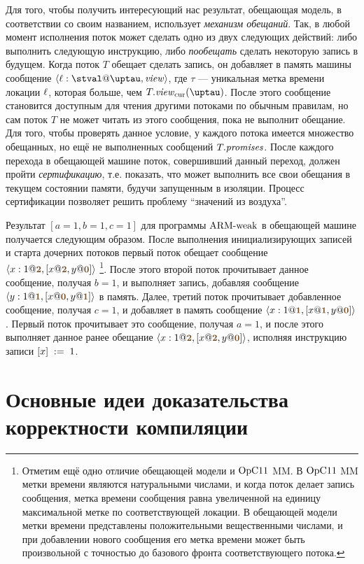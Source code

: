 Для того, чтобы получить интересующий нас результат, обещающая модель, в соответствии со своим названием,
использует \emph{механизм обещаний}.
Так, в любой момент исполнения поток может сделать одно из двух следующих действий:
либо выполнить следующую инструкцию, либо \emph{пообещать} сделать некоторую запись в будущем.
Когда поток $T$ обещает сделать запись, он добавляет в память машины сообщение $\angled{\loc:\stval@\tau,\R}$, где
$\tau$ --- уникальная метка времени локации $\ell$, которая больше, чем $T.\Rcur(\tau)$.
После этого сообщение становится доступным для чтения другими потоками по обычным правилам, но сам поток $T$
не может читать из этого сообщения, пока не выполнит обещание.
Для того, чтобы проверять данное условие, у каждого потока имеется множество обещанных, но ещё не выполненных сообщений $T.\mathit{promises}$.
После каждого перехода в обещающей машине поток, совершивший данный переход, должен пройти \emph{сертификацию},
т.е. показать, что может выполнить все свои обещания в текущем состоянии памяти, будучи запущенным в изоляции.
Процесс сертификации позволяет решить проблему ``значений из воздуха''.

Результат $[a = 1, b = 1, c = 1]$ для программы ${\rm ARM\text{-}weak}$ в обещающей машине получается следующим образом.
После выполнения инициализирующих записей и старта дочерних потоков первый поток обещает сообщение
$\angled{x:1@\tstamp{2},[x@\tstamp{2},y@\tstamp{0}]}$%
\footnote{Отметим ещё одно отличие обещающей модели и $\mathrm{OpC11}$ MM.
В $\mathrm{OpC11}$ MM метки времени являются натуральными числами, и когда поток делает запись сообщения,
метка времени сообщения равна увеличенной на единицу максимальной метке по соответствующей локации.
В обещающей модели метки времени представлены положительными вещественными числами, и при добавлении
нового сообщения его метка времени может быть произвольной с точностью до базового фронта соответствующего потока.}.
После этого второй поток прочитывает данное сообщение, получая $b = 1$, и выполняет запись,
добавляя сообщение $\angled{y:1@\tstamp{1},[x@\tstamp{0},y@\tstamp{1}]}$ в память.
Далее, третий поток прочитывает добавленное сообщение, получая $c = 1$, и добавляет в память сообщение
$\angled{x:1@\tstamp{1},[x@\tstamp{1},y@\tstamp{0}]}$.
Первый поток прочитывает это сообщение, получая $a = 1$, и после этого выполняет данное ранее обещание
$\angled{x:1@\tstamp{2},[x@\tstamp{2},y@\tstamp{0}]}$, исполняя инструкцию записи
$[x]\;:=\;1$.

\section{Основные идеи доказательства корректности компиляции}
\label{sec:armpop:highlevel}


